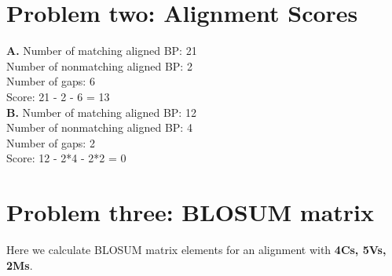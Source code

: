\documentclass[10pt]{article} %
\begin{document}
\section{Problem two: Alignment Scores}
\textbf{A.}
Number of matching aligned BP: 21\\
Number of nonmatching aligned BP: 2\\
Number of gaps: 6\\

Score: 21 - 2 - 6 = 13\\

\textbf{B.}
Number of matching aligned BP: 12\\
Number of nonmatching aligned BP: 4\\
Number of gaps: 2\\

Score: 12 - 2*4 - 2*2 = 0\\

\section{Problem three: BLOSUM matrix}
Here we calculate BLOSUM matrix elements for an alignment with
\textbf{4Cs, 5Vs, 2Ms}.\\
\end{document}
